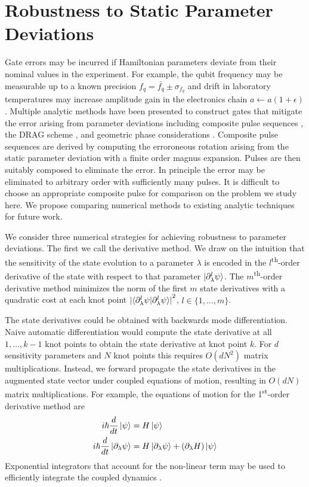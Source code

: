 \documentclass[
  amsfonts,
  amsmath,
  tbtags,
  amssymb,
  aps,
  nobibnotes,
  twocolumn,
  superscriptaddress,
]{revtex4-2}
\begin{document}
\section{Robustness to Static Parameter Deviations}
Gate errors may be incurred if Hamiltonian parameters deviate
from their nominal values in the experiment. For example, the qubit frequency
may be measurable up to a known precision $f_{q} = \bar{f_{q}} \pm \sigma_{f_{q}}$
and drift in laboratory temperatures may increase
amplitude gain in the electronics chain $a \gets a (1 + \epsilon)$.
Multiple analytic methods have been presented to construct gates
that mitigate the error arising from parameter deviations
including composite pulse sequences \cite{merrill2014progress},
the DRAG scheme \cite{krantz2019quantum}, and
geometric phase considerations
\cite{xu2020nonadiabatic, han2020experimental}.
Composite pulse sequences are derived by computing
the erroroneous rotation arising from the static parameter deviation
with a finite order magnus expansion.
Pulses are then suitably composed to eliminate the
error. In principle the error may be eliminated
to arbitrary order with sufficiently many pulses.
It is difficult to choose an appropriate composite pulse
for comparison on the problem we study here. We
propose comparing numerical methods to existing analytic
techniques for future work.

We consider three numerical strategies for achieving robustness
to parameter deviations. The first we call the
derivative method. We draw on the intuition that
the sensitivity of the state evolution to a parameter
$\lambda$ is encoded in the $l$\textsuperscript{th}-order
derivative of the state with respect to that parameter
$\ket{\partial_{\lambda}^{l} \psi}$. The $m$\textsuperscript{th}-order
derivative method minimizes the norm of the first $m$
state derivatives with a quadratic cost at each knot point
${\lvert \braket{\partial^{l}_{\lambda} \psi | \partial^{l}_{\lambda} \psi}
  \rvert}^{2}$, $l \in \{1, \dots, m\}$.

The state derivatives could be obtained with backwards mode differentiation.
Naive automatic differentiation would compute
the state derivative at all $1, \dots, k - 1$ knot points
to obtain the state derivative at knot point $k$.
For $d$ sensitivity parameters and $N$ knot points
this requires $O(d N^2)$ matrix multiplications. Instead,
we forward propagate the state derivatives in the
augmented state vector under coupled equations of motion, resulting
in $O(d N)$ matrix multiplications.
For example, the equations of motion for the 1\textsuperscript{st}-order derivative
method are
\begin{align}
  i \hbar \frac{d}{dt} \ket{\psi} &= H \ket{\psi}\\
  i \hbar \frac{d}{dt} \ket{\partial_{\lambda}\psi} &=
  H \ket{\partial_{\lambda} \psi} +
  (\partial_{\lambda} H) \ket{\psi}
\end{align}
Exponential integrators that account for the non-linear
term may be used to efficiently integrate the coupled dynamics
\cite{berland2005solving, einkemmer2017performance}.
\end{document}
